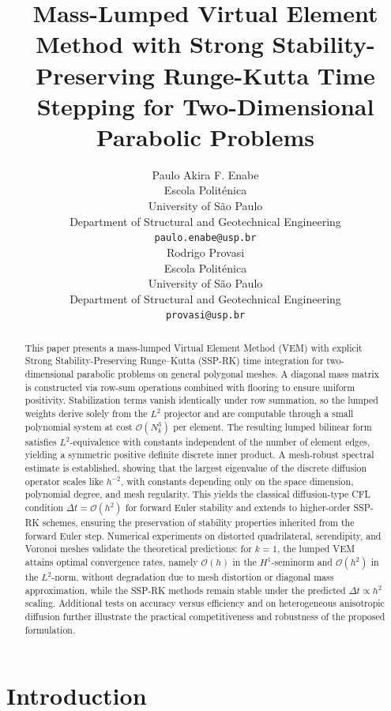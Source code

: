 \documentclass{article}
\title{Mass-Lumped Virtual Element Method with Strong Stability-Preserving Runge-Kutta Time Stepping for Two-Dimensional Parabolic Problems}
\author{
 Paulo Akira F. Enabe \\
    Escola Politénica\\
    University of São Paulo\\
    Department of Structural and Geotechnical Engineering\\
  \texttt{paulo.enabe@usp.br} \\
   \And
 Rodrigo Provasi \\
    Escola Politénica\\
    University of São Paulo\\
    Department of Structural and Geotechnical Engineering\\
  \texttt{provasi@usp.br} \\
}
\begin{document}
\maketitle
\begin{abstract}
    This paper presents a mass-lumped Virtual Element Method (VEM) with explicit Strong Stability-Preserving Runge--Kutta (SSP-RK) time integration for two-dimensional parabolic problems on general polygonal meshes. A diagonal mass matrix is constructed via row-sum operations combined with flooring to ensure uniform positivity. Stabilization terms vanish identically under row summation, so the lumped weights derive solely from the $L^2$ projector and are computable through a small polynomial system at cost $\mathcal{O}(N_k^3)$ per element. The resulting lumped bilinear form satisfies $L^2$-equivalence with constants independent of the number of element edges, yielding a symmetric positive definite discrete inner product. A mesh-robust spectral estimate is established, showing that the largest eigenvalue of the discrete diffusion operator scales like $h^{-2}$, with constants depending only on the space dimension, polynomial degree, and mesh regularity. This yields the classical diffusion-type CFL condition $\Delta t=\mathcal{O}(h^2)$ for forward Euler stability and extends to higher-order SSP-RK schemes, ensuring the preservation of stability properties inherited from the forward Euler step. Numerical experiments on distorted quadrilateral, serendipity, and Voronoi meshes validate the theoretical predictions: for $k=1$, the lumped VEM attains optimal convergence rates, namely $\mathcal{O}(h)$ in the $H^1$-seminorm and $\mathcal{O}(h^2)$ in the $L^2$-norm, without degradation due to mesh distortion or diagonal mass approximation, while the SSP-RK methods remain stable under the predicted $\Delta t\propto h^2$ scaling. Additional tests on accuracy versus efficiency and on heterogeneous anisotropic diffusion further illustrate the practical competitiveness and robustness of the proposed formulation.
\end{abstract}




\section{Introduction}
\label{sec:introduction}
\end{document}
